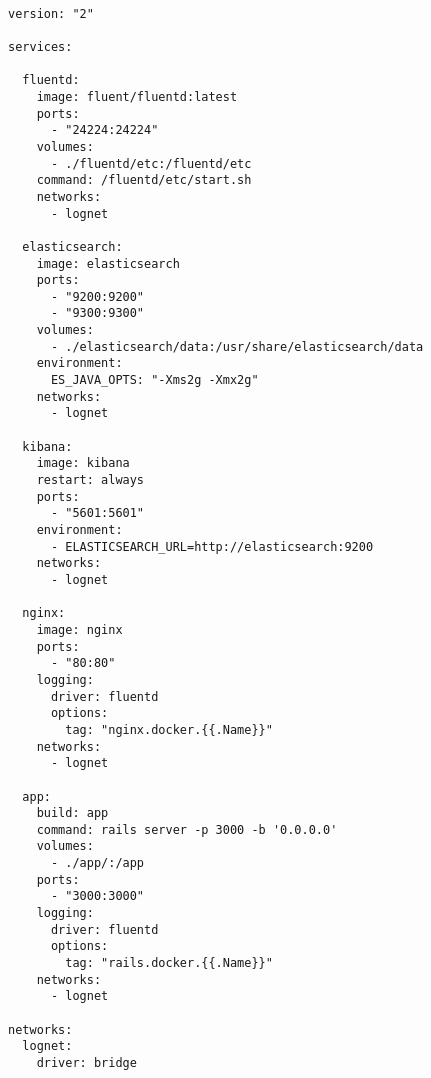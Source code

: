 \begin{lstlisting}

version: "2"

services:

  fluentd:
    image: fluent/fluentd:latest
    ports:
      - "24224:24224"
    volumes:
      - ./fluentd/etc:/fluentd/etc
    command: /fluentd/etc/start.sh
    networks:
      - lognet

  elasticsearch:
    image: elasticsearch
    ports:
      - "9200:9200"
      - "9300:9300"
    volumes:
      - ./elasticsearch/data:/usr/share/elasticsearch/data
    environment:
      ES_JAVA_OPTS: "-Xms2g -Xmx2g"
    networks:
      - lognet

  kibana:
    image: kibana
    restart: always
    ports:
      - "5601:5601"
    environment:
      - ELASTICSEARCH_URL=http://elasticsearch:9200
    networks:
      - lognet

  nginx:
    image: nginx
    ports:
      - "80:80"
    logging:
      driver: fluentd
      options:
        tag: "nginx.docker.{{.Name}}"
    networks:
      - lognet

  app:
    build: app
    command: rails server -p 3000 -b '0.0.0.0'
    volumes:
      - ./app/:/app
    ports:
      - "3000:3000"
    logging:
      driver: fluentd
      options:
        tag: "rails.docker.{{.Name}}"
    networks:
      - lognet

networks:
  lognet:
    driver: bridge

\end{lstlisting}
